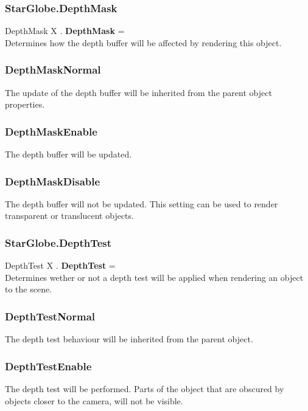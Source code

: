\subsubsection{StarGlobe.DepthMask \label{F:StarGlobe:DepthMask}}
DepthMask X . \textbf{DepthMask} = \\
Determines how the depth buffer will be affected by rendering this object.

\subsubsection{DepthMaskNormal \label{T:DepthMask|DepthMaskNormal}}
The update of the depth buffer will be inherited from the parent object properties.

\subsubsection{DepthMaskEnable \label{T:DepthMask|DepthMaskEnable}}
The depth buffer will be updated.

\subsubsection{DepthMaskDisable \label{T:DepthMask|DepthMaskDisable}}
The depth buffer will not be updated. This setting can be used to render transparent or translucent objects.

\subsubsection{StarGlobe.DepthTest \label{F:StarGlobe:DepthTest}}
DepthTest X . \textbf{DepthTest} = \\
Determines wether or not a depth test will be applied when rendering an object to the scene.

\subsubsection{DepthTestNormal \label{T:DepthTest|DepthTestNormal}}
The depth test behaviour will be inherited from the parent object.

\subsubsection{DepthTestEnable \label{T:DepthTest|DepthTestEnable}}
The depth test will be performed. Parts of the object that are obscured by objects closer to the camera, will not be visible.

